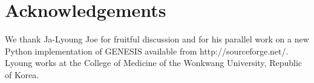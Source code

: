\documentclass[12pt]{article}
\begin{document}




\section*{Acknowledgements}
We thank Ja-Lyoung Joe for fruitful discussion and for his parallel
work on a new Python implementation of GENESIS available from
http://sourceforge.net/.  Lyoung works at the College of Medicine of
the Wonkwang University, Republic of Korea.


\cleardoublepage
{}

%
%


\end{document}
